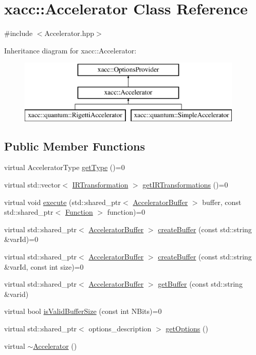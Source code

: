 \hypertarget{a00011}{}\section{xacc\+:\+:Accelerator Class Reference}
\label{a00011}


{\ttfamily \#include $<$Accelerator.\+hpp$>$}

Inheritance diagram for xacc\+:\+:Accelerator\+:\begin{figure}[H]
\begin{center}
\leavevmode
\includegraphics[height=3.000000cm]{a00011}
\end{center}
\end{figure}
\subsection*{Public Member Functions}
\begin{DoxyCompactItemize}
\item 
virtual Accelerator\+Type \hyperlink{a00011_aaffc3e4bb9880eb5041b1b58ee4c2665}{get\+Type} ()=0
\item 
virtual std\+::vector$<$ \hyperlink{a00042}{I\+R\+Transformation} $>$ \hyperlink{a00011_ad6e4a642dcb24e552675bcbeff1e1b04}{get\+I\+R\+Transformations} ()=0
\item 
virtual void \hyperlink{a00011_a89b3f3e6294f228abf03a410b0fb1674}{execute} (std\+::shared\+\_\+ptr$<$ \hyperlink{a00013}{Accelerator\+Buffer} $>$ buffer, const std\+::shared\+\_\+ptr$<$ \hyperlink{a00030}{Function} $>$ function)=0
\item 
virtual std\+::shared\+\_\+ptr$<$ \hyperlink{a00013}{Accelerator\+Buffer} $>$ \hyperlink{a00011_aab5046e8d83ab390302e0f49533e95fc}{create\+Buffer} (const std\+::string \&var\+Id)=0
\item 
virtual std\+::shared\+\_\+ptr$<$ \hyperlink{a00013}{Accelerator\+Buffer} $>$ \hyperlink{a00011_a064a2dbd58338364115c260267806945}{create\+Buffer} (const std\+::string \&var\+Id, const int size)=0
\item 
virtual std\+::shared\+\_\+ptr$<$ \hyperlink{a00013}{Accelerator\+Buffer} $>$ \hyperlink{a00011_ab3820be326e28a553fed1a824f4d41d0}{get\+Buffer} (const std\+::string \&varid)
\item 
virtual bool \hyperlink{a00011_ae51584850faeec77299058383977ddeb}{is\+Valid\+Buffer\+Size} (const int N\+Bits)=0
\item 
virtual std\+::shared\+\_\+ptr$<$ options\+\_\+description $>$ \hyperlink{a00011_a98c9eda6b54367c75667ecfbbf167979}{get\+Options} ()
\item 
virtual \hyperlink{a00011_aed88ab0d71b765f0b0f512684ccd4b55}{$\sim$\+Accelerator} ()
\end{DoxyCompactItemize}
